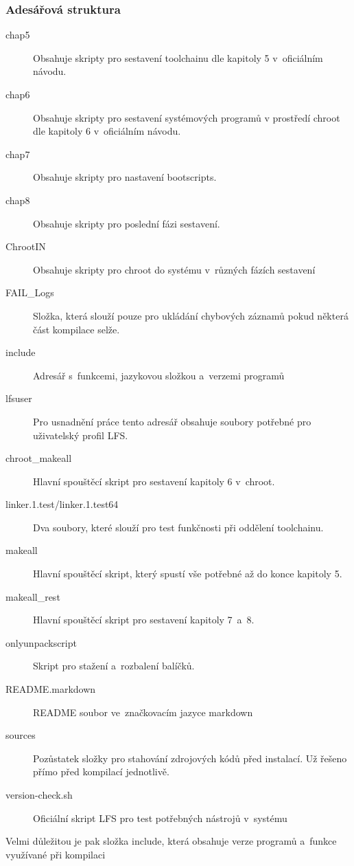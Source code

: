 \documentclass[a4paper,12pt]{article}
\begin{document}
\subsubsection{Adesářová struktura}
\begin{description}
 \item[chap5] Obsahuje skripty pro sestavení toolchainu dle kapitoly 5 v~oficiálním návodu.
 \item[chap6] Obsahuje skripty pro sestavení systémových programů v prostředí chroot dle kapitoly 6 v~oficiálním návodu.
 \item[chap7] Obsahuje skripty pro nastavení bootscripts.
 \item[chap8] Obsahuje skripty pro poslední fázi sestavení.
 \item[ChrootIN] Obsahuje skripty pro chroot do systému v~různých fázích sestavení
 \item[FAIL\_Logs] Složka, která slouží pouze pro ukládání chybových záznamů pokud některá část kompilace selže.
 \item[include] Adresář s~funkcemi, jazykovou složkou a~verzemi programů
 \item[lfsuser] Pro usnadnění práce tento adresář obsahuje soubory potřebné pro uživatelský profil LFS.
 \item[chroot\_makeall] Hlavní spouštěcí skript pro sestavení kapitoly 6 v~chroot.
 \item[linker.1.test/linker.1.test64] Dva soubory, které slouží pro test funkčnosti při oddělení toolchainu.
 \item[makeall] Hlavní spouštěcí skript, který spustí vše potřebné až do konce kapitoly 5.
 \item[makeall\_rest] Hlavní spouštěcí skript pro sestavení kapitoly 7~a~8.
 \item[onlyunpackscript] Skript pro stažení a~rozbalení balíčků.
 \item[README.markdown] README soubor ve~značkovacím jazyce markdown
 \item[sources] Pozůstatek složky pro stahování zdrojových kódů před instalací. Už řešeno přímo před kompilací jednotlivě.
 \item[version-check.sh] Oficiální skript LFS pro test potřebných nástrojů v~systému
 \end{description}

Velmi důležitou je pak složka include, která obsahuje verze programů a~funkce využívané při kompilaci
\end{document}

